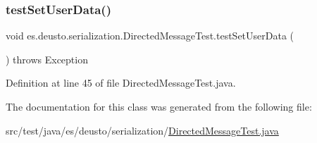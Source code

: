 \mbox{\label{classes_1_1deusto_1_1serialization_1_1_directed_message_test_a91132b0ba7c7932be8b7dfded1e7e74a}} 
\subsubsection{\texorpdfstring{test\+Set\+User\+Data()}{testSetUserData()}}
{\footnotesize\ttfamily void es.\+deusto.\+serialization.\+Directed\+Message\+Test.\+test\+Set\+User\+Data (\begin{DoxyParamCaption}{ }\end{DoxyParamCaption}) throws Exception}



Definition at line 45 of file Directed\+Message\+Test.\+java.



The documentation for this class was generated from the following file\+:\begin{DoxyCompactItemize}
\item 
src/test/java/es/deusto/serialization/\hyperlink{_directed_message_test_8java}{Directed\+Message\+Test.\+java}\end{DoxyCompactItemize}
